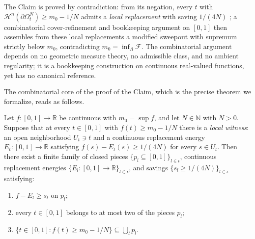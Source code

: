 The Claim is proved by contradiction: from its negation, every
$t$ with $\mathcal{H}^n(\partial \Omega^N_t) \ge m_0 - 1/N$
admits a \emph{local replacement} with saving $1/(4N)$
\cite[Lemma~3.1]{DLT13}; a combinatorial cover-refinement and
bookkeeping argument on $[0,1]$ then assembles from these local
replacements a modified sweepout with supremum strictly below
$m_0$,
contradicting $m_0 = \inf_\Lambda \mathcal{F}$. The combinatorial
argument depends on no geometric measure theory, no admissible
class, and no ambient regularity; it is a bookkeeping
construction on continuous real-valued functions, yet has no
canonical reference.

The combinatorial core of the proof of the Claim, which is the
precise theorem we formalize, reads as follows.

\begin{theorem}
\label{thm:intro-scalar}
Let $f : [0,1] \to \mathbb{R}$ be continuous with
$m_0 = \sup f$, and let $N \in \mathbb{N}$ with $N > 0$. Suppose
that at every $t \in [0,1]$ with $f(t) \ge m_0 - 1/N$ there is a
\emph{local witness}: an open neighborhood $U_t \ni t$ and a
continuous replacement energy $E_t : [0,1] \to \mathbb{R}$
satisfying $f(s) - E_t(s) \ge 1/(4N)$ for every $s \in U_t$.
Then there exist a finite family of closed pieces
$\{p_l \subseteq [0,1]\}_{l \in \iota}$, continuous replacement
energies $\{E_l : [0,1] \to \mathbb{R}\}_{l \in \iota}$, and
savings $\{s_l \ge 1/(4N)\}_{l \in \iota}$ satisfying:
\begin{enumerate}
\item[\textup{(I)}] $f - E_l \ge s_l$ on $p_l$;
\item[\textup{(II)}] every $t \in [0,1]$ belongs to at most
  two of the pieces $p_l$;
\item[\textup{(III)}] $\{t \in [0,1] : f(t) \ge m_0 - 1/N\}
  \subseteq \bigcup_l p_l$.
\end{enumerate}
\end{theorem}

